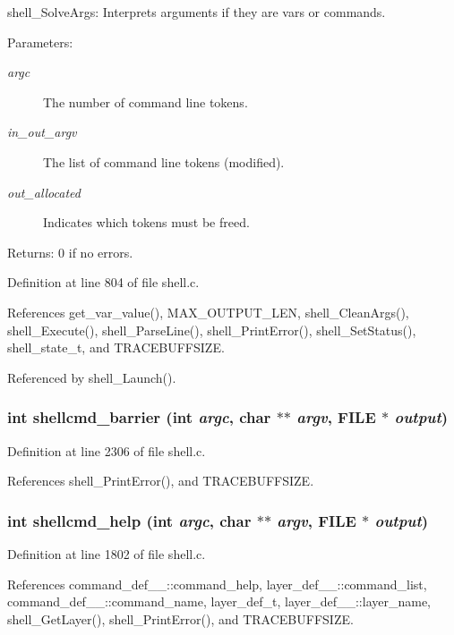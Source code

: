 shell\_\-Solve\-Args: Interprets arguments if they are vars or commands.

\begin{Desc}
\item[Parameters:]
\begin{description}
\item[{\em argc}]The number of command line tokens. \item[{\em in\_\-out\_\-argv}]The list of command line tokens (modified). \item[{\em out\_\-allocated}]Indicates which tokens must be freed.\end{description}
\end{Desc}
\begin{Desc}
\item[Returns:]0 if no errors. \end{Desc}


Definition at line 804 of file shell.c.

References get\_\-var\_\-value(), MAX\_\-OUTPUT\_\-LEN, shell\_\-Clean\-Args(), shell\_\-Execute(), shell\_\-Parse\-Line(), shell\_\-Print\-Error(), shell\_\-Set\-Status(), shell\_\-state\_\-t, and TRACEBUFFSIZE.

Referenced by shell\_\-Launch().
\subsubsection{\setlength{\rightskip}{0pt plus 5cm}int shellcmd\_\-barrier (int {\em argc}, char $\ast$$\ast$ {\em argv}, FILE $\ast$ {\em output})}\label{shell_8h_a41}




Definition at line 2306 of file shell.c.

References shell\_\-Print\-Error(), and TRACEBUFFSIZE.
\subsubsection{\setlength{\rightskip}{0pt plus 5cm}int shellcmd\_\-help (int {\em argc}, char $\ast$$\ast$ {\em argv}, FILE $\ast$ {\em output})}\label{shell_8h_a32}




Definition at line 1802 of file shell.c.

References command\_\-def\_\-\_\-::command\_\-help, layer\_\-def\_\-\_\-::command\_\-list, command\_\-def\_\-\_\-::command\_\-name, layer\_\-def\_\-t, layer\_\-def\_\-\_\-::layer\_\-name, shell\_\-Get\-Layer(), shell\_\-Print\-Error(), and TRACEBUFFSIZE.
